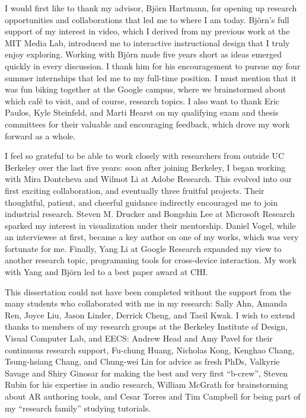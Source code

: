 \begin{acknowledgements}

I would first like to thank my advisor, Bj\"orn Hartmann, for opening up research opportunities and collaborations that led me to where I am today.
%
Bj\"orn's full support of my interest in video, which I derived from my previous work at the MIT Media Lab, introduced me to interactive instructional design that I truly enjoy exploring. Working with Bj\"orn made five years short as ideas emerged quickly in every discussion. I thank him for his encouragement to pursue my four summer internships that led me to my full-time position. I must mention that it was fun biking together at the Google campus, where we brainstormed about which caf\'{e} to visit, and of course, research topics.
I also want to thank Eric Paulos, Kyle Steinfeld, and Marti Hearst on my qualifying exam and thesis committees for their valuable and encouraging feedback, which drove my work forward as a whole.

I feel so grateful to be able to work closely with researchers from outside UC Berkeley over the last five years: soon after joining Berkeley, I began working with Mira Dontcheva and Wilmot Li at Adobe Research. This evolved into our first exciting collaboration, and eventually three fruitful projects. Their thoughtful, patient, and cheerful guidance indirectly encouraged me to join industrial research.
%
Steven M. Drucker and Bongshin Lee at Microsoft Research sparked my interest in visualization under their mentorship.
%
Daniel Vogel, while an interviewee at first, became a key author on one of my works, which was very fortunate for me.
%
Finally, Yang Li at Google Research expanded my view to another research topic, programming tools for cross-device interaction. My work with Yang and Bj\"orn led to a best paper award at CHI.

This dissertation could not have been completed without the support from the many students who collaborated with me in my research: Sally Ahn, Amanda Ren, Joyce Liu, Jason Linder, Derrick Cheng, and Taeil Kwak. I wish to extend thanks to members of my research groups at the Berkeley Institute of Design, Visual Computer Lab, and EECS: Andrew Head and Amy Pavel for their continuous research support, Fu-chung Huang, Nicholas Kong, Kenghao Chang, Tsung-hsiang Chang, and Chung-wei Lin for advice as fresh PhDs, Valkyrie Savage and Shiry Ginosar for making the best and very first ``b-crew'', Steven Rubin for his expertise in audio research, William McGrath for brainstorming about AR authoring tools, and Cesar Torres and Tim Campbell for being part of my ``research family'' studying tutorials.


\end{acknowledgements}
